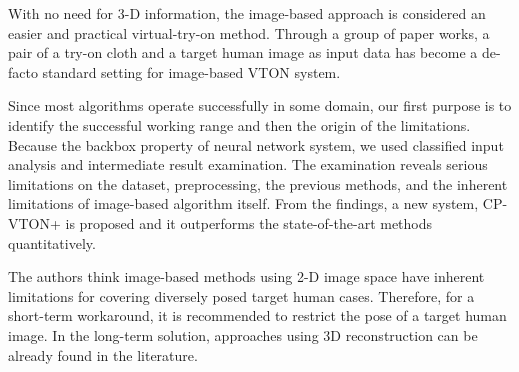 \documentclass[runningheads]{llncs}
\begin{document}
With no need for 3-D information, the image-based approach is considered an easier and practical virtual-try-on method. Through a group of paper works, a pair of a try-on cloth and a target human image as input data has become a de-facto standard setting for image-based VTON system.   

Since most algorithms operate successfully in some domain, our first purpose is to identify the successful working range and then the origin of the limitations. Because the backbox property of neural network system, we used classified input analysis and intermediate result examination. The examination reveals serious limitations on the dataset, preprocessing, the previous methods, and the inherent limitations of image-based algorithm itself. From the findings, a new system, CP-VTON+ is proposed and it outperforms the state-of-the-art methods quantitatively.

The authors think image-based methods using 2-D image space have inherent limitations for covering diversely posed target human cases. Therefore, for a short-term workaround, it is recommended to restrict the pose of a target human image. In the long-term solution, approaches using 3D reconstruction \cite{natsume2019siclope,zanfir2018human} can be already found in the literature. 




\end{document}
